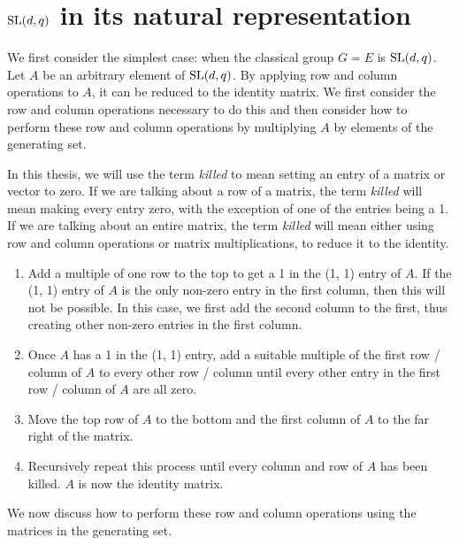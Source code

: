 \documentclass[12pt]{report}
\def\SL{{\rm SL}}
\begin{document}
\section{$\SL(d, q)$ in its natural representation}

We first consider the simplest case: when the classical group $G = E$ is $\SL(d, q)$. Let $A$ be an arbitrary element of $\SL(d, q)$. By applying row and column operations to $A$, it can be reduced to the identity matrix. We first consider the row and column operations necessary to do this and then consider how to perform these row and column operations by multiplying $A$ by elements of the generating set.

In this thesis, we will use the term \textit{killed} to mean setting an entry of a matrix or vector to zero. If we are talking about a row of a matrix, the term \textit{killed} will mean making every entry zero, with the exception of one of the entries being a 1. If we are talking about an entire matrix, the term \textit{killed} will mean either using row and column operations or matrix multiplications, to reduce it to the identity.

\begin{enumerate}
\item Add a multiple of one row to the top to get a 1 in the (1, 1) entry of $A$. If the (1, 1) entry of $A$ is the only non-zero entry in the first column, then this will not be possible. In this case, we first add the second column to the first, thus creating other non-zero entries in the first column.

\item Once $A$ has a 1 in the (1, 1) entry, add a suitable multiple of the first row / column of $A$ to every other row / column until every other entry in the first row / column of $A$ are all zero.

\item Move the top row of $A$ to the bottom and the first column of $A$ to the far right of the matrix.

\item Recursively repeat this process until every column and row of $A$ has been killed. $A$ is now the identity matrix.

\end{enumerate}

We now discuss how to perform these row and column operations using the matrices in the generating set.
\end{document}
